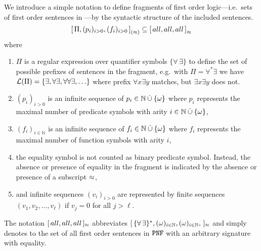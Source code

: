\begin{definition}[\cite{MR1482227}]\label{def:prefix:class}
	We introduce a simple notation to define fragments 
	of first order logic---i.e.~sets of first order sentences in \PNF{}---by 
	the syntactic structure of the included sentences.
	\[
		{[ \, \Pi, (p_i)_{i>0}, (f_i)_{i>0} \, ]}_{(\approx)}
		\subseteq {[\, all, all, all\,]}_{\approx}
	\]
	where 
	\begin{enumerate}
		\item \( \Pi \) is a regular expression over quantifier symbols 
		\( \{ \forall\,\exists \} \) 
		to define the set of possible prefixes of sentences in the fragment, 
		e.g.~with \( \Pi = \forall^*\exists \) we have 
		\( \mathcal{L}(\Pi) = \{ \exists, \forall \exists, \forall\forall\exists, \ldots \} \)
		where prefix \( \forall x \exists y \) matches,
		but \( \exists x \exists y \) does not.
	\item \( (p_i)_{i>0} \) is an infinite sequence of 
	\( p_i \in \mathbb{N}\mathbin{\dot\cup}\{ \omega \} \) where 
	\( p_i \) represents the maximal number of predicate symbols 
	with arity \( i \in \mathbb{N}\mathbin{\dot\cup}\{ \omega \} \),
	\item \( (f_i)_{i\in\mathbb{N}} \) is an infinite sequence of 
	\( f_i \in \mathbb{N}\mathbin{\dot\cup}\{ \omega \} \) where
	\( f_i \) represents the maximal number of function symbols with arity \( i \),
	\item the equality symbol is not counted as binary predicate symbol. 
	Instead, the absence or presence of equality in the fragment
	is indicated by the absence or presence of a subscript \( \approx \),
% 
	\item and infinite sequences \( (v_i)_{i>0} \) are represented by
	finite sequences \( (v_1,v_2,\ldots,v_\ell) \) if
	\( v_j = 0 \) for all \( j > \ell \).
\end{enumerate}
\begin{remark}
	The notation \( [\,all,all,all\,]_{\approx} \) abbreviates
	\( [\,
		\{\forall\,\exists\}^{*}, 
		(\omega)_{i\in\mathbb{N}},
		(\omega)_{i\in\mathbb{N}},	  
	\,]_{\approx} \) 
	and simply denotes to the set of all first order sentences in \( \texttt{PNF} \)
	with an arbitrary signature with equality. 
\end{remark}
\end{definition}


